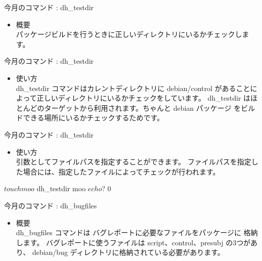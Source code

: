 
\begin{frame}{今月のコマンド : dh\_testdir}
\begin{itemize}
\item 概要\\
パッケージビルドを行うときに正しいディレクトリにいるかチェックします。
\end{itemize}
\end{frame}

\begin{frame}[containsverbatim]{今月のコマンド : dh\_testdir}
\begin{itemize}
\item 使い方\\

dh\_testdir コマンドはカレントディレクトリに debian/control があることに
よって正しいディレクトリにいるかチェックをしています。
dh\_testdir はほとんどのターゲットから利用されます。ちゃんと debian パッケージ
をビルドできる場所にいるかチェックするためです。

\end{itemize}

\end{frame}

\begin{frame}[containsverbatim]{今月のコマンド : dh\_testdir}
\begin{itemize}
\item 使い方\\
引数としてファイルパスを指定することができます。
ファイルパスを指定した場合には、指定したファイルによってチェックが行われます。
\end{itemize}

\begin{commandline}
$ touch moo
$ dh_testdir moo
$ echo $?
0
\end{commandline}
\end{frame}



\begin{frame}{今月のコマンド : dh\_bugfiles}
\begin{itemize}
\item 概要\\
dh\_bugfiles コマンドは バグレポートに必要なファイルをパッケージに
格納します。
バグレポートに使うファイルは script、control、presubj の3つがあり、
debian/bug ディレクトリに格納されている必要があります。
\end{itemize}
\end{frame}

